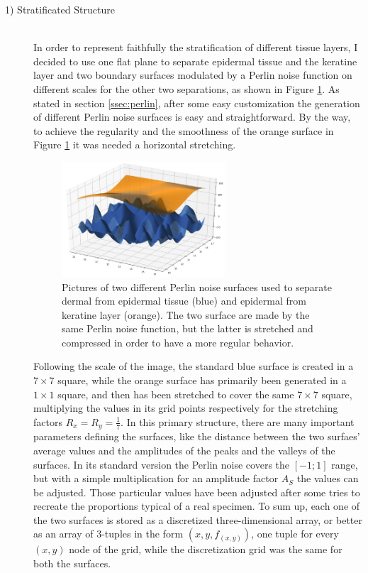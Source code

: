 \documentclass[12pt,a4paper]{report}
\begin{document}
\begin{description}
    \item [1) Stratificated Structure] \hfill \\
    In order to represent faithfully the stratification of different tissue layers, I decided to use one flat plane to separate epidermal tissue and the keratine layer and two boundary surfaces modulated by a Perlin noise function on different scales for the other two separations, as shown in Figure \ref{fig:2_surf_plot}. As stated in section \ref{ssec:perlin}, after some easy customization the generation of different Perlin noise surfaces is easy and straightforward. By the way, to achieve the regularity and the smoothness of the orange surface in Figure \ref{fig:2_surf_plot} it was needed a horizontal stretching.

    \begin{figure}
        \centering
        \includegraphics[width = 0.6\textwidth]{images/2_surf_plot}
        \caption{Pictures of two different Perlin noise surfaces used to separate dermal from epidermal tissue (blue) and epidermal from keratine layer (orange). The two surface are made by the same Perlin noise function, but the latter is stretched and compressed in order to have a more regular behavior.}
        \label{fig:2_surf_plot}
    \end{figure}

    Following the scale of the image, the standard blue surface is created in a $7 \times 7$ square, while the orange surface has primarily been generated in a $1 \times 1$ square, and then has been stretched to cover the same $7 \times 7$ square, multiplying the values in its grid points respectively for the stretching factors $R_x=R_y=\frac{1}{7}$. In this primary structure, there are many important parameters defining the surfaces, like the distance between the two surfaes' average values and the amplitudes of the peaks and the valleys of the surfaces. In its standard version the Perlin noise covers the $[-1;1]$ range, but with a simple multiplication for an amplitude factor $A_S$ the values can be adjusted. Those particular values have been adjusted after some tries to recreate the proportions typical of a real specimen. To sum up, each one of the two surfaces is stored as a discretized three-dimensional array, or better as an array of 3-tuples in the form $(x,y,f_{(x,y)})$, one tuple for every $(x,y)$ node of the grid, while the discretization grid was the same for both the surfaces.


\end{description}
\end{document}
